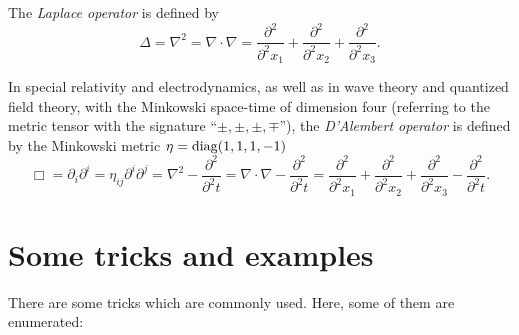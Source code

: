 The {\em Laplace operator}
is defined by
\begin{equation}
\Delta = \nabla^2= \nabla \cdot \nabla =
\frac{\partial^2 }{\partial^2 x_1}+
\frac{\partial^2 }{\partial^2 x_2}+
\frac{\partial^2 }{\partial^2 x_3}
.
\end{equation}

In special relativity and electrodynamics,  as well as in  wave theory and quantized field theory, with the Minkowski space-time
of dimension four
(referring to the metric tensor with the signature ``$\pm ,\pm ,\pm ,\mp$''),
the {\em D'Alembert operator}
is defined by the Minkowski metric $\eta = {\rm diag} (1,1,1,-1)$
\begin{equation}
\Box  = \partial_i \partial^i
=
\eta_{ij}  \partial^i \partial^j=
\nabla^2- \frac{\partial^2 }{\partial^2 t}=
\nabla \cdot \nabla - \frac{\partial^2 }{\partial^2 t}=
\frac{\partial^2 }{\partial^2 x_1}+
\frac{\partial^2 }{\partial^2 x_2}+
\frac{\partial^2 }{\partial^2 x_3}- \frac{\partial^2 }{\partial^2 t}
.
\end{equation}



\section{Some tricks and examples}

There are some tricks which are commonly used.
Here, some of them are enumerated:


